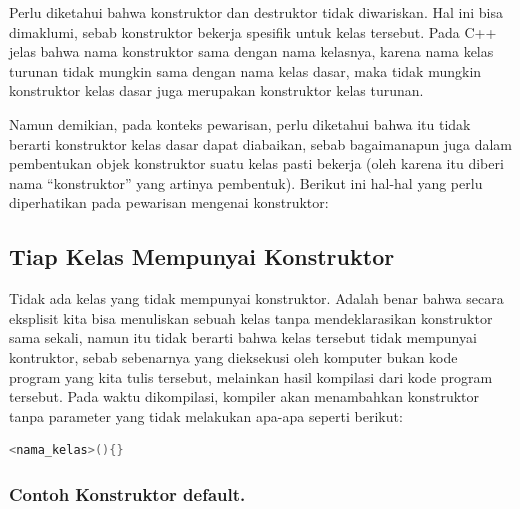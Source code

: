 Perlu diketahui bahwa konstruktor dan destruktor tidak diwariskan. Hal
ini bisa dimaklumi, sebab konstruktor bekerja spesifik untuk kelas
tersebut. Pada C++ jelas bahwa nama konstruktor sama dengan nama
kelasnya, karena nama kelas turunan tidak mungkin sama dengan nama kelas
dasar, maka tidak mungkin konstruktor kelas dasar juga merupakan
konstruktor kelas turunan.

Namun demikian, pada konteks pewarisan, perlu diketahui bahwa itu tidak
berarti konstruktor kelas dasar dapat diabaikan, sebab bagaimanapun juga
dalam pembentukan objek konstruktor suatu kelas pasti bekerja (oleh
karena itu diberi nama ``konstruktor'' yang artinya pembentuk). Berikut
ini hal-hal yang perlu diperhatikan pada pewarisan mengenai konstruktor:

\subsection{Tiap Kelas Mempunyai
Konstruktor}\label{tiap-kelas-mempunyai-konstruktor}

Tidak ada kelas yang tidak mempunyai konstruktor. Adalah benar bahwa
secara eksplisit kita bisa menuliskan sebuah kelas tanpa mendeklarasikan
konstruktor sama sekali, namun itu tidak berarti bahwa kelas tersebut
tidak mempunyai kontruktor, sebab sebenarnya yang dieksekusi oleh
komputer bukan kode program yang kita tulis tersebut, melainkan hasil
kompilasi dari kode program tersebut. Pada waktu dikompilasi, kompiler
akan menambahkan konstruktor tanpa parameter yang tidak melakukan
apa-apa seperti berikut:

\begin{lstlisting}[language=c++, numbers=none]
<nama_kelas>(){}
\end{lstlisting}

\subsubsection*{Contoh  Konstruktor default.}

